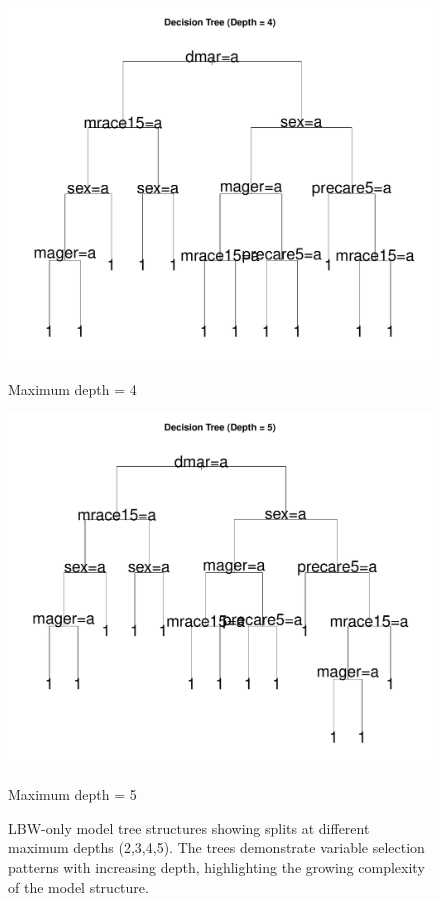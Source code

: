 \begin{figure}[p]
    \vspace{1cm}
    
    \begin{minipage}{0.48\textwidth}
        \centering
        \includegraphics[width=\linewidth]{chapters/chapter3/figures/depth/plot2/decision_tree_depth_4_2021_large.pdf}
        \caption*{Maximum depth = 4}
    \end{minipage}
    \hspace{0.02\textwidth}
    \begin{minipage}{0.48\textwidth}
        \centering
        \includegraphics[width=\linewidth]{chapters/chapter3/figures/depth/plot2/decision_tree_depth_5_2021_large.pdf}
        \caption*{Maximum depth = 5}
    \end{minipage}
    \caption{LBW-only model tree structures showing splits at different maximum depths (2,3,4,5). The trees demonstrate variable selection patterns with increasing depth, highlighting the growing complexity of the model structure.}
    \label{fig:trees-comparison-lbw}
\end{figure}


